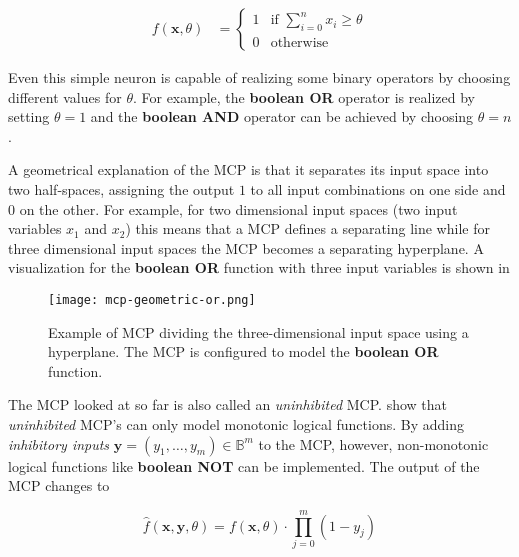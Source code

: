 \begin{equation}
    \begin{split}
        \label{eq:mcculloch-binary}
        f(\bm{x}, \theta) 
        &= 
        \begin{cases}
            1 & \text{if } \sum_{i=0}^n x_i \geq \theta \\
            0 & \text{otherwise}
        \end{cases}
    \end{split}
\end{equation}

Even this simple neuron is capable of realizing some binary operators by choosing different values for $\theta$.
For example, the \textbf{boolean OR} operator is realized by setting $\theta = 1$ and the \textbf{boolean AND} operator can be achieved by choosing $\theta = n$.

A geometrical explanation of the MCP is that it separates its input space into two half-spaces, assigning the output $1$ to all input combinations on one side and $0$ on the other.
For example, for two dimensional input spaces (two input variables $x_1$ and $x_2$) this means that a MCP defines a separating line while for three dimensional input spaces the MCP becomes a separating hyperplane.
A visualization for the \textbf{boolean OR} function with three input variables is shown in 

\begin{figure}[htb!]
    \centering
    \texttt{[image: mcp-geometric-or.png]}
    \caption{Example of MCP dividing the three-dimensional input space using a hyperplane. The MCP is configured to model the \textbf{boolean OR} function. \cite{rojas_neural_1996}}
    \label{fig:mcp-geometric-or}
\end{figure}

The MCP looked at so far is also called an \textit{uninhibited} MCP.
\cite{rojas_neural_1996} show that \textit{uninhibited} MCP's can only model monotonic logical functions.
By adding \textit{inhibitory inputs} $\bm{y} = (y_1, \dots, y_m) \in \mathbb{B}^m$ to the MCP, however, non-monotonic logical functions like \textbf{boolean NOT} can be implemented.
The output of the MCP changes to 

\begin{equation}
    \hat{f}(\bm{x}, \bm{y}, \theta) = f(\bm{x}, \theta) \cdot \prod_{j = 0}^m (1 - y_j)
\end{equation}


